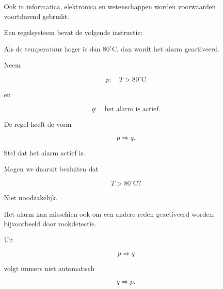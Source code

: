 \documentclass{ximera}
\begin{document}
Ook in informatica, elektronica en wetenschappen worden voorwaarden
voortdurend gebruikt.


\begin{voorbeeld}

Een regelsysteem bevat de volgende instructie:

\begin{center}
Als de temperatuur hoger is dan $80^\circ\mathrm{C}$,
dan wordt het alarm geactiveerd.
\end{center}

Neem

\[
p:\quad T>80^\circ\mathrm{C}
\]

en

\[
q:\quad \text{het alarm is actief}.
\]

De regel heeft de vorm

\[
p\Rightarrow q.
\]

Stel dat het alarm actief is.

Mogen we daaruit besluiten dat

\[
T>80^\circ\mathrm{C}?
\]

Niet noodzakelijk.

Het alarm kan misschien ook om een andere reden geactiveerd worden,
bijvoorbeeld door rookdetectie.

Uit

\[
p\Rightarrow q
\]

volgt immers niet automatisch

\[
q\Rightarrow p.
\]

\end{voorbeeld}
\end{document}
